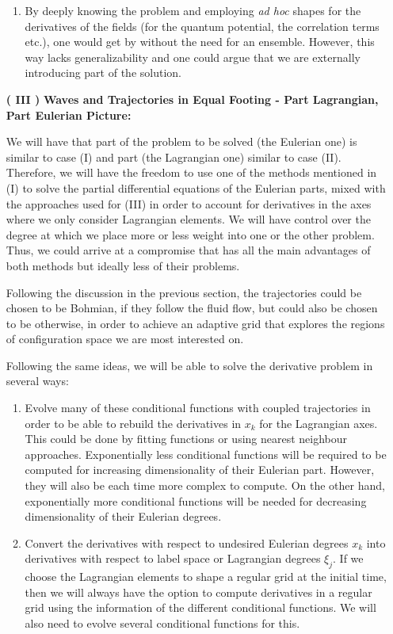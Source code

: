 \documentclass[11pt, a4paper]{article} %
\begin{document}
\begin{enumerate}
\begin{enumerate}
\item By deeply knowing the problem and employing {\em ad hoc} shapes for the derivatives of the fields (for the quantum potential, the correlation terms etc.), one would get by without the need for an ensemble. However, this way lacks generalizability and one could argue that we are externally introducing part of the solution.\vspace{0.2cm}
\end{enumerate}


\item [\bf ( III )] {\bf Waves and Trajectories in Equal Footing - Part Lagrangian, Part Eulerian Picture:}\vspace{0.15cm}

We will have that part of the problem to be solved (the Eulerian one) is similar to case (I) and part (the Lagrangian one) similar to case (II). Therefore, we will have the freedom to use one of the methods mentioned in (I) to solve the partial differential equations of the Eulerian parts, mixed with the approaches used for (III) in order to account for derivatives in the axes where we only consider Lagrangian elements. We will have control over the degree at which we place more or less weight into one or the other problem. Thus, we could arrive at a compromise that has all the main advantages of both methods but ideally less of their problems.

Following the discussion in the previous section, the trajectories could be chosen to be Bohmian, if they follow the fluid flow, but could also be chosen to be otherwise, in order to achieve an adaptive grid that explores the regions of configuration space we are most interested on.

Following the same ideas, we will be able to solve the derivative problem in several ways:
\begin{enumerate}
\item Evolve many of these conditional functions with coupled trajectories in order to be able to rebuild the derivatives in $x_k$ for the Lagrangian axes. This could be done by fitting functions or using nearest neighbour approaches. Exponentially less conditional functions will be required to be computed for increasing dimensionality of their Eulerian part. However, they will also be each time more complex to compute. On the other hand, exponentially more conditional functions will be needed for decreasing dimensionality of their Eulerian degrees.

\item Convert the derivatives with respect to undesired Eulerian degrees $x_k$ into derivatives with respect to label space or Lagrangian degrees $\xi_j$. If we choose the Lagrangian elements to shape a regular grid at the initial time, then we will always have the option to compute derivatives in a regular grid using the information of the different conditional functions. We will also need to evolve several conditional functions for this.


\end{enumerate}
\end{enumerate}
\end{document}
